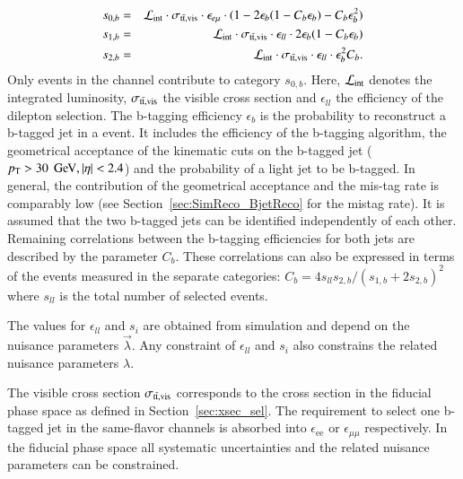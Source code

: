 \begin{eqnarray}
s_{0,b}  &=& \mathcal{L}_\mathrm{int} \cdot \sigma_{\mathrm{t}\bar{\mathrm{t}},\mathrm{vis}}\cdot \epsilon_{e\mu} \cdot (1-2\epsilon_b(1-C_b\epsilon_b)-C_b\epsilon_b^2) \\
s_{1,b}  &=& \mathcal{L}_\mathrm{int} \cdot \sigma_{\mathrm{t}\bar{\mathrm{t}},\mathrm{vis}} \cdot \epsilon_{ll} \cdot 2 \epsilon_b(1-C_b\epsilon_b) \\
s_{2,b}  &=& \mathcal{L}_\mathrm{int} \cdot \sigma_{\mathrm{t}\bar{\mathrm{t}},\mathrm{vis}} \cdot \epsilon_{ll} \cdot   \epsilon_b^2 C_b.
\label{eq:xsec_nb}
\end{eqnarray}
Only events in the \emu channel contribute to category $s_{0,b}$.
Here, $\mathcal{L}_\mathrm{int}$ denotes the integrated luminosity, $\sigma_{\mathrm{t}\bar{\mathrm{t}},\mathrm{vis}}$ the visible \ttbar cross section and $\epsilon_{ll}$ the efficiency of the dilepton selection.
The b-tagging efficiency $\epsilon_b$ is the probability to reconstruct a b-tagged jet in a \ttbar event. It includes the efficiency of the b-tagging algorithm, the geometrical acceptance of the kinematic cuts on the b-tagged jet ($p_{\mathrm{T}} > 30\; \,\text{Ge\hspace{-.08em}V}, |\eta|<2.4$) and the probability of a light jet to be b-tagged. In general, the contribution of the geometrical acceptance and the mis-tag rate is comparably low (see Section~\ref{sec:SimReco_BjetReco} for the mistag rate).
It is assumed that the two b-tagged jets can be identified independently of each other. Remaining correlations between the b-tagging efficiencies for both jets are described by the parameter $C_b$. These correlations can also be expressed in terms of the events measured in the separate categories: $C_b=4s_{ll}s_{2,b}/(s_{1,b}+2s_{2,b})^2$ where $s_{ll}$ is the total number of selected \ttbar events. 

The values for $\epsilon_{ll}$ and $s_{i}$ are obtained from simulation and depend on the nuisance parameters $\vec{\lambda}$. Any constraint of $\epsilon_{ll}$ and $s_{i}$ also constrains the related nuisance parameters $\lambda$.

The visible cross section $\sigma_{\mathrm{t}\bar{\mathrm{t}},\mathrm{vis}}$ corresponds to the cross section in the fiducial phase space as defined in Section~\ref{sec:xsec_sel}. The requirement to select one b-tagged jet in the same-flavor channels is absorbed into $\epsilon_{\mathrm{ee}}$ or $\epsilon_{\mu\mu}$ respectively.
In the fiducial phase space all systematic uncertainties and the related nuisance parameters can be constrained.

